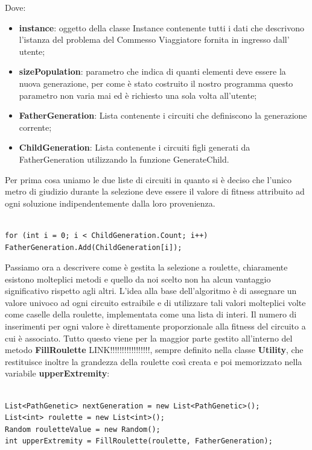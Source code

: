 \documentclass[11pt]{article}
\begin{document}
Dove:

\begin{itemize}
    
    \item \textbf{instance}: oggetto della classe Instance contenente tutti i dati che descrivono l'istanza del problema del Commesso Viaggiatore fornita in ingresso dall' utente;
    \item \textbf{sizePopulation}: parametro che indica di quanti elementi deve essere la nuova generazione, per come è stato costruito il nostro programma questo parametro non varia mai ed è richiesto una sola volta all'utente;
    \item \textbf{FatherGeneration}: Lista contenente i circuiti che definiscono la generazione corrente;
    \item \textbf{ChildGeneration}: Lista contenente i circuiti figli generati da FatherGeneration utilizzando la funzione GenerateChild.
    
\end{itemize}

Per prima cosa uniamo le due liste di circuiti in quanto si è deciso che l'unico metro di giudizio durante la selezione deve essere il valore di fitness attribuito ad ogni soluzione indipendentemente dalla loro provenienza.

\begin{lstlisting}

for (int i = 0; i < ChildGeneration.Count; i++)
FatherGeneration.Add(ChildGeneration[i]);

\end{lstlisting}

Passiamo ora a descrivere come è gestita la selezione a roulette, chiaramente esistono molteplici metodi e quello da noi scelto non ha alcun vantaggio significativo rispetto agli altri. L'idea alla base dell'algoritmo è di assegnare un valore univoco ad ogni circuito estraibile e di utilizzare tali valori molteplici volte come caselle della roulette, implementata come una lista di interi. Il numero di inserimenti per ogni valore è direttamente proporzionale alla fitness del circuito a cui è associato. Tutto questo viene per la maggior parte gestito all'interno del metodo \textbf{FillRoulette} LINK!!!!!!!!!!!!!!!!!, sempre definito nella classe \textbf{Utility}, che restituisce inoltre la grandezza della roulette così creata e poi memorizzato nella variabile \textbf{upperExtremity}:

\begin{lstlisting}

List<PathGenetic> nextGeneration = new List<PathGenetic>();
List<int> roulette = new List<int>();
Random rouletteValue = new Random();
int upperExtremity = FillRoulette(roulette, FatherGeneration);

\end{lstlisting}
\end{document}
